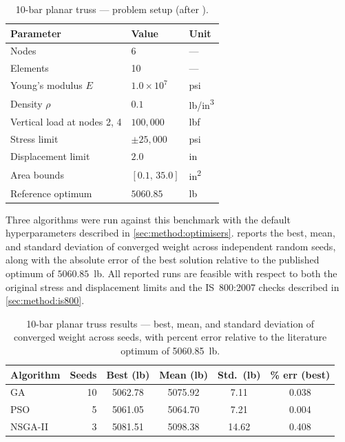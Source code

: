 \begin{table}[htbp]
  \centering
  \caption{10-bar planar truss — problem setup (after
    \cite{sunar1991}).}
  \label{tab:results:10bar-setup}
  \begin{tabular}{lll}
    \toprule
    Parameter               & Value                       & Unit \\
    \midrule
    Nodes                   & 6                           & --- \\
    Elements                & 10                          & --- \\
    Young's modulus $E$     & $1.0 \times 10^{7}$         & psi \\
    Density $\rho$          & $0.1$                       & lb/in\textsuperscript{3} \\
    Vertical load at nodes 2, 4 & $100{,}000$             & lbf \\
    Stress limit            & $\pm 25{,}000$              & psi \\
    Displacement limit      & $2.0$                       & in \\
    Area bounds             & $[0.1,\, 35.0]$             & in\textsuperscript{2} \\
    Reference optimum       & $5060.85$                   & lb \\
    \bottomrule
  \end{tabular}
\end{table}

Three algorithms were run against this benchmark with the default
hyperparameters described in \cref{sec:method:optimisers}.
 reports the best, mean, and standard
deviation of converged weight across independent random seeds, along
with the absolute error of the best solution relative to the published
optimum of $5060.85$~lb. All reported runs are feasible with respect
to both the original stress and displacement limits and the
IS~800:2007 checks described in \cref{sec:method:is800}.

\begin{table}[htbp]
  \centering
  \caption{10-bar planar truss results — best, mean, and standard
    deviation of converged weight across seeds, with percent error
    relative to the literature optimum of \num{5060.85}~lb.}
  \label{tab:results:10bar}
  \begin{tabular}{lrSSSS}
    \toprule
    Algorithm & Seeds & {Best (lb)} & {Mean (lb)} & {Std.\ (lb)} & {\% err (best)} \\
    \midrule
    GA      & 10 & 5062.78 & 5075.92 & 7.11  & 0.038 \\
    PSO     & 5  & 5061.05 & 5064.70 & 7.21  & 0.004 \\
    NSGA-II & 3  & 5081.51 & 5098.38 & 14.62 & 0.408 \\
    \bottomrule
  \end{tabular}
\end{table}

